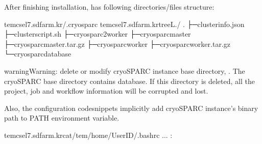 \documentclass[a4paper,11pt,english]{sphinxmanual}
\begin{document}
\sphinxAtStartPar
After finishing installation,  has following directories/files structure:

\begin{sphinxVerbatim}[commandchars=\\\{\}]
tem\PYGZhy{}cs\PYGZhy{}el7.sdfarm.kr\PYGZdl{}\PYGZgt{}\PYGZti{}/.cryosparc
tem\PYGZhy{}cs\PYGZhy{}el7.sdfarm.kr\PYGZdl{}\PYGZgt{}tree\PYGZhy{}L./
.
├─cluster\PYGZus{}info.json
├─cluster\PYGZus{}script.sh
├─cryosparc2\PYGZus{}worker
├─cryosparc\PYGZus{}master
├─cryosparc\PYGZus{}master.tar.gz
├─cryosparc\PYGZus{}worker
├─cryosparc\PYGZus{}worker.tar.gz
└─cryosparc\PYGZus{}database
\end{sphinxVerbatim}

\begin{sphinxadmonition}{warning}{Warning:}
\sphinxAtStartPar
{}  delete or modify cryoSPARC instance base directory, . The cryoSPARC base directory contains database. If this directory is deleted,
all the project, job and workflow information will be corrupted and lost.
\end{sphinxadmonition}

\sphinxAtStartPar
Also, the configuration code\sphinxhyphen{}snippets implicitly add cryoSPARC instance’s binary path to PATH environment variable.

\begin{sphinxVerbatim}[commandchars=\\\{\}]
tem\PYGZhy{}cs\PYGZhy{}el7.sdfarm.kr\PYGZdl{}\PYGZgt{}cat/tem/home/\PYGZlt{}UserID\PYGZgt{}/.bashrc
...
:
\end{sphinxVerbatim}
\end{document}
